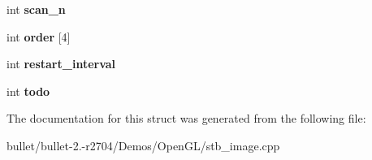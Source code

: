 \begin{DoxyCompactItemize}
\item 
\hypertarget{structjpeg_adca2f04da72e50086c77c7070731a679}{int {\bfseries scan\+\_\+n}}\label{structjpeg_adca2f04da72e50086c77c7070731a679}

\item 
\hypertarget{structjpeg_ac0f5240fc472e75239328f51a50f45b6}{int {\bfseries order} \mbox{[}4\mbox{]}}\label{structjpeg_ac0f5240fc472e75239328f51a50f45b6}

\item 
\hypertarget{structjpeg_ab13af34259b1f1c6cf8f35411a77e39e}{int {\bfseries restart\+\_\+interval}}\label{structjpeg_ab13af34259b1f1c6cf8f35411a77e39e}

\item 
\hypertarget{structjpeg_a6b4a8a352872847d84ea5ef1a4bc245e}{int {\bfseries todo}}\label{structjpeg_a6b4a8a352872847d84ea5ef1a4bc245e}

\end{DoxyCompactItemize}


The documentation for this struct was generated from the following file\+:\begin{DoxyCompactItemize}
\item 
bullet/bullet-\/2.-\/r2704/\+Demos/\+Open\+G\+L/stb\+\_\+image.\+cpp\end{DoxyCompactItemize}
